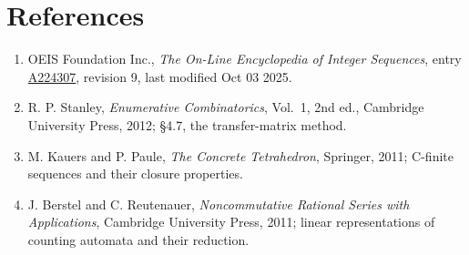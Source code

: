 \documentclass[11pt]{article}
\theoremstyle{definition}
\begin{document}
\section{References}

\begin{enumerate}

\item OEIS Foundation Inc., \emph{The On-Line Encyclopedia of Integer Sequences}, entry \href{https://oeis.org/A224307}{A224307}, revision 9, last modified Oct 03 2025.

\item R. P. Stanley, \emph{Enumerative Combinatorics}, Vol.~1, 2nd ed., Cambridge University Press, 2012; \S4.7, the transfer-matrix method.

\item M. Kauers and P. Paule, \emph{The Concrete Tetrahedron}, Springer, 2011; C-finite sequences and their closure properties.

\item J. Berstel and C. Reutenauer, \emph{Noncommutative Rational Series with Applications}, Cambridge University Press, 2011; linear representations of counting automata and their reduction.

\end{enumerate}
\end{document}
